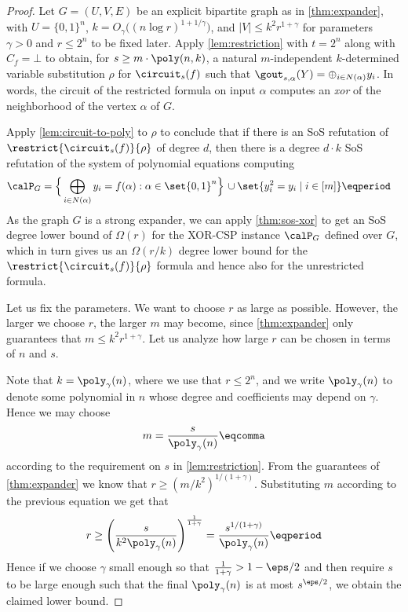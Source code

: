 \begin{proof}
  Let $G = (U, V, E)$ be an explicit bipartite graph as in
  \cref{thm:expander}, with $U = \{0,1\}^n$,
  $k = O_{\gamma}\big((n \log r)^{1 + 1/\gamma}\big)$, and
  $|V| \le k^2 r^{1+\gamma}$ for parameters $\gamma > 0$ and
  $r \le 2^n$ to be fixed later. Apply \cref{lem:restriction} with $t=2^n$ along with
  $C_f = \bot$ to obtain, for $s \ge m \cdot \poly(n, k)$, a natural
  $m$-independent $k$-determined variable substitution $\rho$ for
  $\circuit_s(f)$ such that
  $\gout_{s, \alpha}(Y) = \oplus_{i \in N(\alpha)} y_i$. In words, the
  circuit of the restricted formula on input $\alpha$ computes an
  \emph{xor} of the neighborhood of the vertex $\alpha$ of $G$.

  Apply \cref{lem:circuit-to-poly} to $\rho$ to conclude that if there
  is an SoS refutation of $\restrict{\circuit_s(f)}{\rho}$ of degree
  $d$, then there is a degree $d \cdot k$ SoS refutation of the system
  of polynomial equations computing
  \begin{align}
    \nonumber
    \calP_G
    &= \Big\{
    \bigoplus_{i \in N(\alpha)} y_i = f(\alpha)
    :
    \alpha \in \set{0,1}^n
    \Big\}\,
    \cup
    \set{
    y_i^2 = y_i\mid i \in [m]
    }
    \eqperiod
  \end{align}
%
  As the graph $G$ is a strong expander, we can apply
  \cref{thm:sos-xor} to get an SoS degree lower bound of $\Omega(r)$
  for the XOR-CSP instance $\calP_G$ defined over $G$, which in turn
  gives us an $\Omega(r/k)$ degree lower bound for the
  $\restrict{\circuit_s(f)}{\rho}$ formula and hence also for the
  unrestricted formula.

  Let us fix the parameters. We want to choose $r$ as large as
  possible. However, the larger we choose $r$, the larger $m$ may
  become, since \cref{thm:expander} only guarantees that
  $m \le k^2 r^{1+\gamma}$. Let us analyze how large $r$ can be chosen
  in terms of $n$ and $s$.

  Note that $k = \poly_\gamma(n)$, where we use that $r \le 2^n$, and we write
  $\poly_\gamma(n)$ to denote some polynomial in $n$ whose degree and
  coefficients may depend on $\gamma$. Hence we may choose
  \begin{align}
    m = \frac{s}{\poly_{\gamma}(n)} \eqcomma
  \end{align}
  according to the requirement on $s$ in \cref{lem:restriction}.  From
  the guarantees of \cref{thm:expander} we know that
  $r \ge (m/k^2)^{1/(1+\gamma)}$. Substituting $m$ according to the
  previous equation we get that
  \begin{align}
    r
    \ge
    \left(
    \frac{s}{
    k^2 \poly_{\gamma}(n)
    }
    \right)^{\frac{1}{1 + \gamma}}
    =
    \frac{s^{1/(1 + \gamma)}}{\poly_{\gamma}(n)} \eqperiod
  \end{align}
  Hence if we choose $\gamma$ small enough so that
  $\frac{1}{1+\gamma} > 1-\eps/2$ and then require $s$ to be large
  enough such that the final $\poly_{\gamma}(n)$ is at most
  $s^{\eps/2}$, we obtain the claimed lower bound.
\end{proof}

